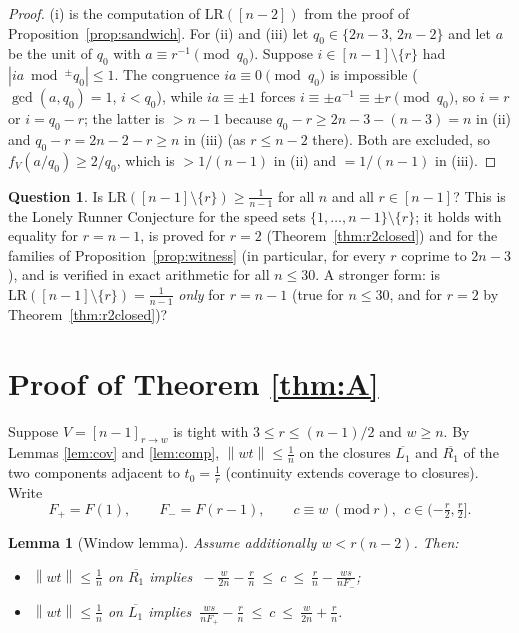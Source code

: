 \documentclass[11pt]{article}
\newtheorem{lemma}[theorem]{Lemma}
\theoremstyle{definition}
\newtheorem{question}[theorem]{Question}
\newcommand{\LR}{\mathrm{LR}}
\newcommand{\norm}[1]{\left\lVert #1 \right\rVert}
\begin{document}
\begin{proof}
(i) is the computation of $\LR([n-2])$ from the proof of
Proposition~\ref{prop:sandwich}.  For (ii) and (iii) let
$q_0\in\{2n-3,\,2n-2\}$ and let $a$ be the unit of $q_0$ with
$a\equiv r^{-1}\pmod{q_0}$.  Suppose $i\in[n-1]\setminus\{r\}$ had
$|ia\bmod^{\pm}q_0|\le1$.  The congruence $ia\equiv0\pmod{q_0}$ is
impossible ($\gcd(a,q_0)=1$, $i<q_0$), while $ia\equiv\pm1$ forces
$i\equiv\pm a^{-1}\equiv\pm r\pmod{q_0}$, so $i=r$ or $i=q_0-r$; the
latter is $>n-1$ because $q_0-r\ge2n-3-(n-3)=n$ in (ii) and
$q_0-r=2n-2-r\ge n$ in (iii) (as $r\le n-2$ there).  Both are excluded,
so $f_V(a/q_0)\ge2/q_0$, which is $>1/(n-1)$ in (ii) and $=1/(n-1)$ in
(iii).
\end{proof}

\begin{question}\label{q:deletion}
Is $\LR([n-1]\setminus\{r\})\ge\frac1{n-1}$ for all $n$ and all
$r\in[n-1]$?  This is the Lonely Runner Conjecture for the speed sets
$\{1,\dots,n-1\}\setminus\{r\}$; it holds with equality for $r=n-1$, is
proved for $r=2$ (Theorem~\ref{thm:r2closed}) and for the families of
Proposition~\ref{prop:witness} (in particular, for every $r$ coprime to
$2n-3$), and is verified in exact arithmetic for all $n\le30$.  A
stronger form: is $\LR([n-1]\setminus\{r\})=\frac1{n-1}$ \emph{only}
for $r=n-1$ (true for $n\le30$, and for $r=2$ by
Theorem~\ref{thm:r2closed})?
\end{question}

\section{Proof of Theorem \ref{thm:A}}\label{sec:thmA}

Suppose $V=[n-1]_{r\to w}$ is tight with $3\le r\le(n-1)/2$ and $w\ge n$.
By Lemmas \ref{lem:cov} and \ref{lem:comp}, $\norm{wt}\le\frac1n$ on the
closures $\overline{L_1}$ and $\overline{R_1}$ of the two components
adjacent to $t_0=\frac1r$ (continuity extends coverage to closures). Write
\[
F_+=F(1),\qquad F_-=F(r-1),\qquad
c\equiv w\ (\mathrm{mod}\ r),\ \ c\in(-\tfrac r2,\tfrac r2].
\]

\begin{lemma}[Window lemma]\label{lem:win}
Assume additionally $w<r(n-2)$. Then:
\begin{itemize}
\item[\emph{(R)}] $\norm{wt}\le\frac1n$ on $\overline{R_1}$ implies
$\ -\frac{w}{2n}-\frac rn\ \le\ c\ \le\ \frac rn-\frac{ws}{nF_-}$;
\item[\emph{(L)}] $\norm{wt}\le\frac1n$ on $\overline{L_1}$ implies
$\ \frac{ws}{nF_+}-\frac rn\ \le\ c\ \le\ \frac{w}{2n}+\frac rn$.
\end{itemize}
\end{lemma}
\end{document}
